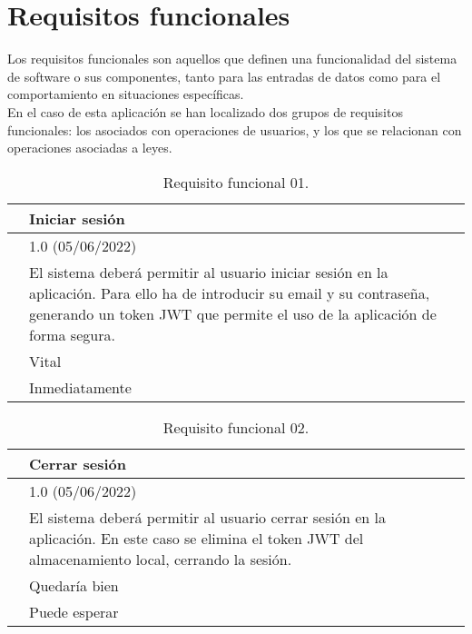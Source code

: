 \section{Requisitos funcionales}

Los requisitos funcionales \cite{requisitos} son aquellos que definen una funcionalidad del sistema de software o sus componentes, tanto para las entradas de datos como para el comportamiento en situaciones específicas.
\\

En el caso de esta aplicación se han localizado dos grupos de requisitos funcionales: los asociados con operaciones de usuarios, y los que se relacionan con operaciones asociadas a leyes.

\begin{table}[H]
\begin{center}
\begin{tabular}{|p{3cm}|p{10cm}|} \hline
\centering {\bf FRQ-01} & Iniciar sesión  \\ \hline\hline
\centering {\bf Versión} & 1.0 (05/06/2022) \\ \hline
\centering {\bf Descripción} & El sistema deberá permitir al usuario iniciar sesión en la aplicación. Para ello ha de introducir su email y su contraseña, generando un token JWT que permite el uso de la aplicación de forma segura. \\ \hline
\centering {\bf Importancia} & Vital \\ \hline
\centering {\bf Urgencia} & Inmediatamente \\ \hline
\end{tabular}
\caption{Requisito funcional 01.}
\label{enlaceFRQ1}
\end{center}
\end{table}

\begin{table}[H]
\begin{center}
\begin{tabular}{|p{3cm}|p{10cm}|} \hline
\centering {\bf FRQ-02} & Cerrar sesión  \\ \hline\hline
\centering {\bf Versión} & 1.0 (05/06/2022) \\ \hline
\centering {\bf Descripción} & El sistema deberá permitir al usuario cerrar sesión en la aplicación. En este caso se elimina el token JWT del almacenamiento local, cerrando la sesión. \\ \hline
\centering {\bf Importancia} & Quedaría bien \\ \hline
\centering {\bf Urgencia} & Puede esperar \\ \hline
\end{tabular}
\caption{Requisito funcional 02.}
\label{enlaceFRQ2}
\end{center}
\end{table}

